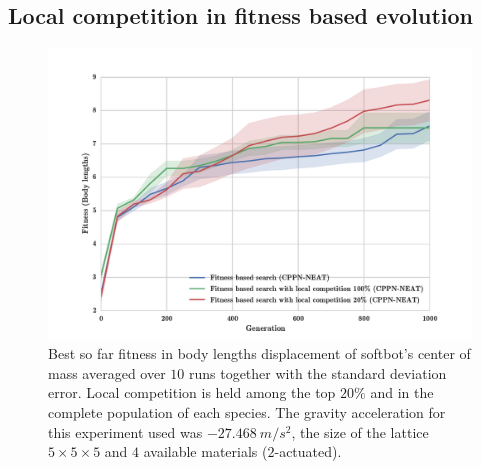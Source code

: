 
\clearpage
\subsection{Local competition in fitness based evolution}

\begin{figure}[h!]
\centering
\includegraphics[width=1.0\textwidth]{../Figures/Results/fitComp100_20percent.pdf}
\caption{Best so far fitness in body lengths displacement of softbot's center of mass averaged over $10$ runs together with the standard deviation error. Local competition is held among the top $20\%$ and in the complete population of each species. The gravity acceleration for this experiment used was $-27.468\   m/s^2$, the size of the lattice $5\times 5\times5$ and $4$ available materials ($2$-actuated).}
\label{fig:fitComp100_20percent}
\end{figure}

